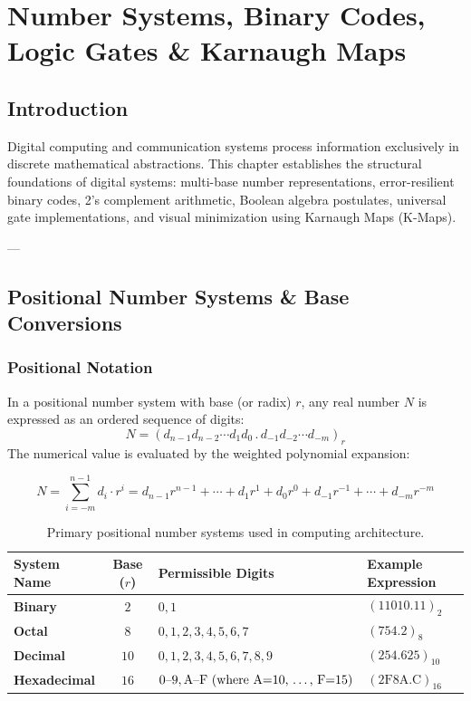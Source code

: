 \chapter{Number Systems, Binary Codes, Logic Gates \& Karnaugh Maps}
\label{chap:number-systems-logic-gates}

\section{Introduction}
Digital computing and communication systems process information exclusively in discrete mathematical abstractions. This chapter establishes the structural foundations of digital systems: multi-base number representations, error-resilient binary codes, 2's complement arithmetic, Boolean algebra postulates, universal gate implementations, and visual minimization using Karnaugh Maps (K-Maps).

---

\section{Positional Number Systems \& Base Conversions}

\subsection{Positional Notation}
In a positional number system with base (or radix) $r$, any real number $N$ is expressed as an ordered sequence of digits:
\begin{equation}
    N = (d_{n-1} d_{n-2} \cdots d_1 d_0 \,.\, d_{-1} d_{-2} \cdots d_{-m})_r
\end{equation}
The numerical value is evaluated by the weighted polynomial expansion:
\begin{keyequation}
\begin{equation}
    N = \sum_{i=-m}^{n-1} d_i \cdot r^i = d_{n-1}r^{n-1} + \cdots + d_1 r^1 + d_0 r^0 + d_{-1}r^{-1} + \cdots + d_{-m}r^{-m}
\end{equation}
\end{keyequation}

\begin{table}[htbp]
\centering
\small
\begin{tabularx}{\textwidth}{p{2.5cm}cp{4.5cm}X}
\toprule
\textbf{System Name} & \textbf{Base ($r$)} & \textbf{Permissible Digits} & \textbf{Example Expression} \\
\midrule
\textbf{Binary} & $2$ & $0, 1$ & $(11010.11)_2$ \\
\textbf{Octal} & $8$ & $0, 1, 2, 3, 4, 5, 6, 7$ & $(754.2)_8$ \\
\textbf{Decimal} & $10$ & $0, 1, 2, 3, 4, 5, 6, 7, 8, 9$ & $(254.625)_{10}$ \\
\textbf{Hexadecimal} & $16$ & $0\text{--}9, \text{A}\text{--}\text{F} \text{ (where A=10, \dots, F=15)}$ & $(2\text{F}8\text{A}.\text{C})_{16}$ \\
\bottomrule
\end{tabularx}
\caption{Primary positional number systems used in computing architecture.}
\label{tab:number-systems}
\end{table}

